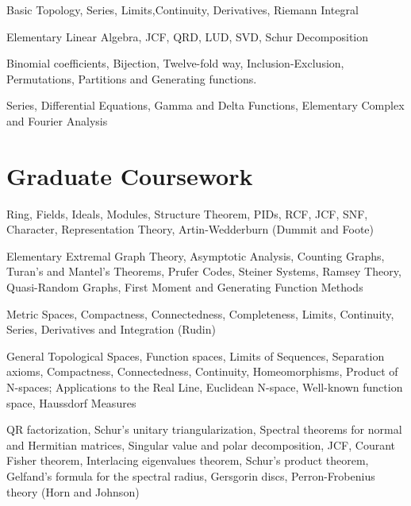 \documentclass[]{deedy-resume-openfont}
\begin{document}
\begin{minipage}[t]{0.55\textwidth}
\small Basic Topology, Series, Limits,Continuity, Derivatives, Riemann Integral
\sectionsep

\small Elementary Linear Algebra, JCF, QRD, LUD, SVD, Schur Decomposition 
\sectionsep

\small Binomial coefficients, Bijection, Twelve-fold way, Inclusion-Exclusion, Permutations, Partitions and Generating functions.
\sectionsep


\small Series, Differential Equations, Gamma and Delta Functions, Elementary Complex and Fourier Analysis

\sectionsep

\section{Graduate Coursework}
\small Ring, Fields, Ideals, Modules, Structure Theorem, PIDs, RCF, JCF, SNF, Character, Representation Theory, Artin-Wedderburn (Dummit and Foote)
\sectionsep

\small Elementary Extremal Graph Theory, Asymptotic Analysis, Counting Graphs, Turan's and Mantel's Theorems, Prufer Codes, Steiner Systems, Ramsey Theory, Quasi-Random Graphs, First Moment and Generating Function Methods 
\sectionsep

\small Metric Spaces, Compactness, Connectedness, Completeness, Limits, Continuity, Series, Derivatives and Integration (Rudin)
\sectionsep

\small General Topological Spaces, Function spaces, Limits of Sequences, Separation axioms, Compactness, Connectedness, Continuity, Homeomorphisms, Product of N-spaces; Applications to the Real Line, Euclidean N-space,  Well-known function space, Haussdorf Measures 
\sectionsep

\small QR factorization, Schur’s unitary triangularization, Spectral theorems for normal and Hermitian matrices, Singular value and polar decomposition, JCF, Courant Fisher theorem, Interlacing eigenvalues theorem, Schur’s product theorem, Gelfand’s formula for the spectral radius, Gersgorin discs, Perron-Frobenius theory (Horn and Johnson)
\sectionsep


\end{minipage}
\end{document}
